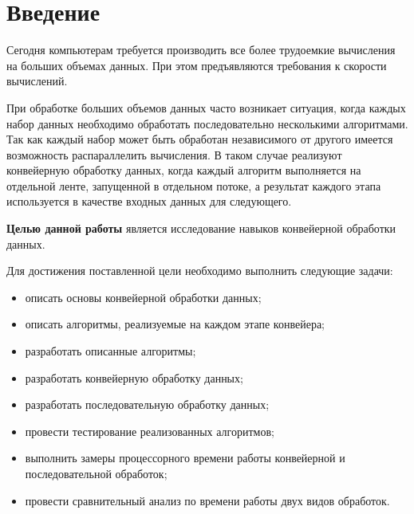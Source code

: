 \chapter*{Введение}

Сегодня компьютерам требуется производить все более трудоемкие вычисления на больших
объемах данных. При этом предъявляются требования к скорости вычислений.

При обработке больших объемов данных часто возникает ситуация, когда каждых
набор данных необходимо обработать последовательно несколькими алгоритмами. Так
как каждый набор может быть обработан независимого от другого имеется
возможность распараллелить вычисления. В таком случае реализуют конвейерную
обработку данных, когда каждый алгоритм выполняется на отдельной ленте,
запущенной в отдельном потоке, а результат каждого этапа используется в
качестве входных данных для следующего.

\textbf{Целью данной работы} является исследование навыков
конвейерной обработки данных.

Для достижения поставленной цели необходимо выполнить следующие задачи:
\begin{itemize}[left=\parindent]
    \item описать основы конвейерной обработки данных;
    \item описать алгоритмы, реализуемые на каждом этапе конвейера;
    \item разработать описанные алгоритмы;
    \item разработать конвейерную обработку данных;
    \item разработать последовательную обработку данных;
    \item провести тестирование реализованных алгоритмов;
	\item выполнить замеры процессорного времени работы конвейерной и последовательной обработок;
	\item провести сравнительный анализ по времени работы двух видов обработок.
\end{itemize}

